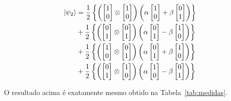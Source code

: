 \begin{equation}\label{eq:final}
  \begin{split}
\ket{\psi_2} &=\frac{1}{2} \left\{ \left(\begin{bmatrix}
1 \\
0
\end{bmatrix} \otimes \begin{bmatrix}
1 \\
0
\end{bmatrix}\right) \left(\alpha \begin{bmatrix}
1 \\
0
\end{bmatrix} + \beta \begin{bmatrix}
0 \\
1
\end{bmatrix}\right)\right\} \nonumber \\
&+\frac{1}{2} \left\{ \left(\begin{bmatrix}
0 \\
1
\end{bmatrix} \otimes \begin{bmatrix}
0 \\
1
\end{bmatrix}\right) \left(\alpha \begin{bmatrix}
0 \\
1
\end{bmatrix} - \beta \begin{bmatrix}
1 \\
0
\end{bmatrix}\right)\right\} \nonumber \\
&+\frac{1}{2} \left\{\left( \begin{bmatrix}
1 \\
0
\end{bmatrix} \otimes \begin{bmatrix}
0 \\
1
\end{bmatrix}\right) \left(\alpha \begin{bmatrix}
0 \\
1
\end{bmatrix} + \beta \begin{bmatrix}
1 \\
0
\end{bmatrix}\right)\right\} \nonumber \\
&+\frac{1}{2} \left\{ \left( \begin{bmatrix}
0 \\
1
\end{bmatrix} \otimes \begin{bmatrix}
1 \\
0
\end{bmatrix}\right) \left(\alpha \begin{bmatrix}
1 \\
0
\end{bmatrix} - \beta \begin{bmatrix}
0 \\
1
\end{bmatrix}\right) \right\}
  \end{split}
\end{equation}

O resultado acima é exatamente mesmo obtido na Tabela~\ref{tab:medidas}.
